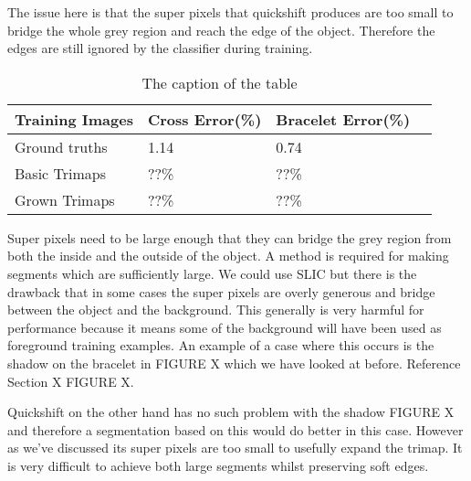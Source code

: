 \documentclass[12pt]{IIBproject}
\begin{document}
 The issue here is that the super pixels that quickshift produces are too small to bridge the whole grey region and reach the edge of the object. Therefore the edges are still ignored by the classifier during training. 
\begin{table}
\begin{center}
    \begin{tabular}{ | l | l | l | p{5cm} |}
    \hline
    Training Images & Cross Error(\%) & Bracelet Error(\%) \\ \hline
    Ground truths & 1.14 & 0.74 \\ \hline
    Basic Trimaps & ??\% & ??\% \\
    \hline
    Grown Trimaps & ??\% & ??\% \\
    \hline
    \end{tabular}
    \caption{The caption of the table}\label{table:somename}
\end{center}
\end{table}
Super pixels need to be large enough that they can bridge the grey region from both the inside and the outside of the object. A method is required for making segments which are sufficiently large. We could use SLIC but there is the drawback that in some cases the super pixels are overly generous and bridge between the object and the background. This generally is very harmful for performance because it means some of the background will have been used as foreground training examples. An example of a case where this occurs is the shadow on the bracelet in FIGURE X which we have looked at before. Reference Section X FIGURE X.

Quickshift on the other hand has no such problem with the shadow FIGURE X and therefore a segmentation based on this would do better in this case. However as we've discussed its super pixels are too small to usefully expand the trimap. It is very difficult to achieve both large segments whilst preserving soft edges. 
\end{document}

